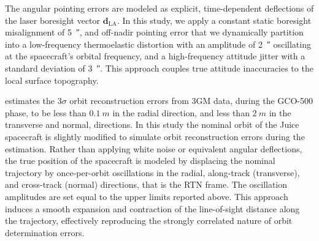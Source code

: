 \documentclass[lineno, pdflatex,sn-mathphys-ay]{sn-jnl}
\theoremstyle{thmstyleone}%
\theoremstyle{thmstyletwo}%
\theoremstyle{thmstylethree}%
\renewcommand{\vec}[1]{\boldsymbol{#1}}
\begin{document}
The angular pointing errors are modeled as explicit, time-dependent deflections of the laser boresight vector $\vec{d}_{\mathrm{LA}}$.
In this study, we apply a constant static boresight misalignment of 
\SI{5}{\arcsecond},
and off-nadir pointing error that we dynamically partition into a low-frequency thermoelastic distortion with an amplitude of 
\SI{2}{\arcsecond} oscillating at the spacecraft's orbital frequency, and a high-frequency attitude jitter with a standard deviation of 
\SI{3}{\arcsecond}. This approach couples true attitude inaccuracies to the local surface topography.

\cite{2020P&SS..18704902C} estimates the $3\sigma$ orbit reconstruction errors from 3GM data, during the GCO-500 phase, to be less than $\SI{0.1}{m}$ in the radial direction, and less than $\SI{2}{m}$ in the transverse and normal, directions. 
%
In this study the nominal orbit of the Juice spacecraft is slightly modified to simulate orbit reconstruction errors during the estimation. Rather than applying white noise or equivalent angular deflections, the true position of the spacecraft is modeled by displacing the nominal trajectory by once-per-orbit oscillations 
in the radial, along-track (transverse), and cross-track (normal) directions, that is the RTN frame. The oscillation amplitudes are set equal to the upper limits  reported above.
This approach induces a smooth expansion and contraction of the line-of-sight distance along the trajectory, effectively reproducing the strongly correlated nature of orbit determination errors.

%
\end{document}
